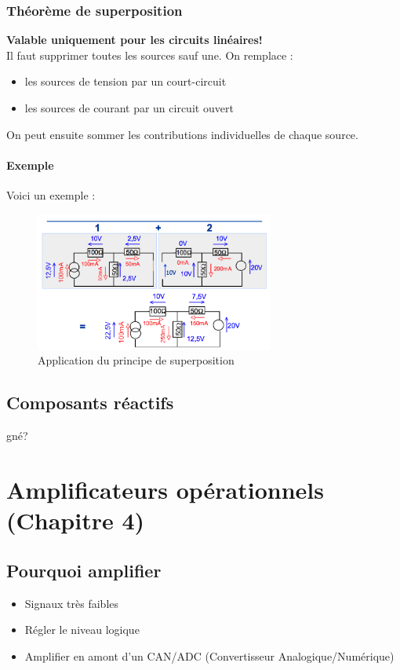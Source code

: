 \documentclass[a4paper]{article}
\begin{document}
    \subsubsection{Théorème de superposition}
    \textbf{Valable uniquement pour les circuits linéaires!}\\

    Il faut supprimer toutes les sources sauf une. On remplace :
    \begin{itemize}
        \item les sources de tension par un court-circuit
        \item les sources de courant par un circuit ouvert
    \end{itemize}
    On peut ensuite sommer les contributions individuelles de chaque source.

    \paragraph{Exemple} Voici un exemple :
    \begin{figure}[H]
        \begin{center}
            \includegraphics[width=0.7\textwidth]{fig/2_superposition.png}
            \caption{Application du principe de superposition}
            \label{fig:2_superposition}
        \end{center}
    \end{figure}

    \subsection{Composants réactifs}

    gné?

\section{Amplificateurs opérationnels (Chapitre 4)}
    \subsection{Pourquoi amplifier}
        \begin{itemize}
            \item Signaux très faibles
            \item Régler le niveau logique
            \item Amplifier en amont d'un CAN/ADC (Convertisseur Analogique/Numérique)
        \end{itemize}
\end{document}
